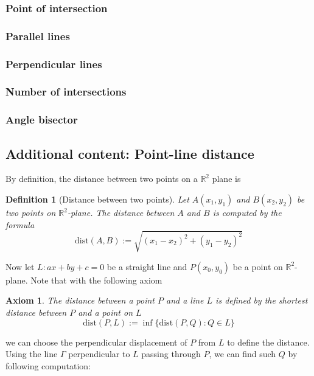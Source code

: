 \documentclass[12pt]{article}
\newtheorem{definition}{Definition}[section]
\newtheorem*{axiom}{Axiom}
\begin{document}
    \subsubsection*{Point of intersection}

    \subsubsection*{Parallel lines}

    \subsubsection*{Perpendicular lines}

    \subsubsection*{Number of intersections}

    \subsubsection*{Angle bisector}

    \subsection{Additional content: Point-line distance}

    By definition, the distance between two points on a $\mathbb{R}^2$ plane is 

    \begin{definition}[Distance between two points]
        Let $A(x_1,y_1)$ and $B(x_2,y_2)$ be two points on $\mathbb{R}^2$-plane. The distance between $A$ and $B$ is computed by the formula $$\mathrm{dist}(A,B):=\sqrt{(x_1-x_2)^2+(y_1-y_2)^2}$$
    \end{definition}

    Now let $L:ax+by+c=0$ be a straight line and $P(x_0,y_0)$ be a point on $\mathbb{R}^2$-plane. Note that with the following axiom

    \begin{axiom}
        The distance between a point $P$ and a line $L$ is defined by the shortest distance between $P$ and a point on $L$ $$\mathrm{dist}(P,L):=\inf\{\mathrm{dist}(P,Q):Q\in L\}$$
    \end{axiom}

    we can choose the perpendicular displacement of $P$ from $L$ to define the distance. Using the line $\Gamma$ perpendicular to $L$ passing through $P$, we can find such $Q$ by following computation:
\end{document}
